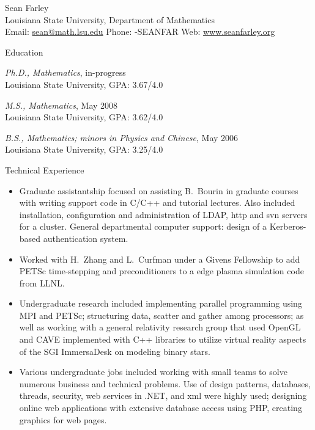 \documentclass[10pt]{article}
\begin{document}
\newlength{\oldcvlabelwidth}
\newlength{\oldcvlabelsep}

\newcommand{\name}{Sean Farley}
\newcommand{\institute}{Louisiana State University}
\newcommand{\dept}{Department of Mathematics}

\begin{cv}{{\large \name}\\
{\normalsize Louisiana State University, 
Department of Mathematics\\
Email: {\mdseries \href{mailto:sean@math.lsu.edu}
	{sean@math.lsu.edu}} 
\hfill Phone: {-SEANFAR} \hfill 
Web: {\mdseries \href{http://www.seanfarley.org/}
	{www.seanfarley.org}}}
}

\setlength{\oldcvlabelwidth}{\cvlabelwidth}
\setlength{\oldcvlabelsep}{\cvlabelsep}

\setlength{\cvlabelwidth}{1em}

\begin{cvlist}{Education}
	\item \emph{Ph.D., Mathematics}, in-progress\\
	\institute, GPA: 3.67/4.0
	\item \emph{M.S., Mathematics}, May 2008\\ 
	\institute, GPA: 3.62/4.0
	\item \emph{B.S., Mathematics; minors in Physics and Chinese}, May 2006\\
	\institute, GPA: 3.25/4.0
\end{cvlist}

\setlength{\cvlabelwidth}{0em}
\setlength{\cvlabelsep}{\labelsep}
\begin{cvlist}{Technical Experience}
\item
	\begin{itemize}\itemsep=0.25em
	\item Graduate assistantship focused on assisting B.~Bourin in graduate courses
		with writing support code in C/C++ and tutorial lectures. Also included
		installation, configuration and administration of LDAP, http and svn
		servers for a cluster. General departmental computer support: design of a
		Kerberos-based authentication system.
	\item Worked with H.~Zhang and L.~Curfman under a Givens Fellowship to add
		PETSc time-stepping and preconditioners to a edge plasma simulation code from LLNL.
	\item Undergraduate research included implementing parallel programming using MPI and PETSc;
		structuring data, scatter and gather among processors; as well as working with a general
		relativity research group that used OpenGL and CAVE implemented with C++ libraries to
		utilize virtual reality aspects of the SGI ImmersaDesk on modeling binary stars.
	\item Various undergraduate jobs included working with small teams to solve numerous business
		and technical problems. Use of design patterns, databases, threads, security, web services in .NET,
		and xml were highly used; designing online web applications with extensive database access using PHP,
		creating graphics for web pages.
	\end{itemize}
\end{cvlist}


\end{cv}
\end{document}

